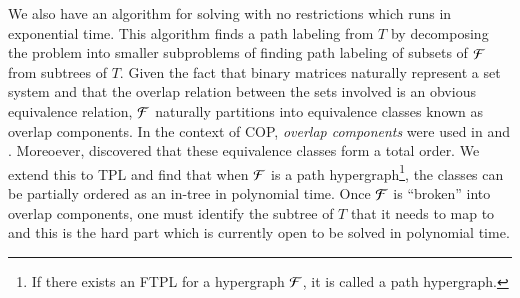 \documentclass[MS,synopsis]{iitmdiss}
\begin{document}
We also have an algorithm for solving {\CFTPL} with no restrictions
which runs in exponential time. 
This algorithm finds a path labeling from $T$ by decomposing the
problem into smaller subproblems of finding path labeling of subsets
of ${\cal F}$ from subtrees of $T$. Given the fact that binary matrices
naturally represent a set
system %
and that the overlap relation between the sets involved is an obvious
equivalence relation, ${\cal F}$ naturally partitions into equivalence
classes known as overlap components. In the context of COP, {\em overlap
components} were used in \cite{wlh02} and \cite{kklv10}. Moreoever,
\cite{nsnrs09} discovered that these equivalence classes form a total
order. We extend this to TPL and find that when ${\cal F}$ is a path
hypergraph\footnote{If there exists an FTPL for a hypergraph ${\cal F}$, it
  is called a path hypergraph.}, the classes can be partially ordered
as an in-tree in polynomial time. Once ${\cal F}$ is
``broken'' into overlap components, one must identify the subtree of
$T$ that it needs to map to and this is the hard part which is
currently open to be solved in polynomial time.




\end{document}
